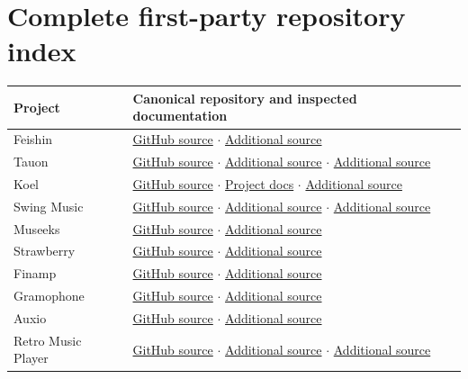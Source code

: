 \documentclass[10pt,a4paper,oneside]{report}
\begin{document}
\section*{Complete first-party repository index}
\begin{longtable}{@{}p{38mm}p{112mm}@{}}\toprule Project & Canonical repository and inspected documentation\\\midrule\endhead
Feishin & \href{https://github.com/jeffvli/feishin}{GitHub source} $\cdot$ \href{https://github.com/jeffvli/feishin/blob/development/README.md}{Additional source}\\
Tauon & \href{https://github.com/Taiko2k/Tauon}{GitHub source} $\cdot$ \href{https://github.com/Taiko2k/Tauon/blob/master/pyproject.toml}{Additional source} $\cdot$ \href{https://github.com/Taiko2k/Tauon/blob/master/CHANGELOG.md}{Additional source}\\
Koel & \href{https://github.com/koel/koel}{GitHub source} $\cdot$ \href{https://docs.koel.dev/}{Project docs} $\cdot$ \href{https://github.com/koel/koel/blob/master/README.md}{Additional source}\\
Swing Music & \href{https://github.com/swingmx/swingmusic}{GitHub source} $\cdot$ \href{https://github.com/swingmx/swingmusic/blob/master/Dockerfile}{Additional source} $\cdot$ \href{https://github.com/swingmx/webclient}{Additional source}\\
Museeks & \href{https://github.com/martpie/museeks}{GitHub source} $\cdot$ \href{https://github.com/martpie/museeks/blob/master/README.md}{Additional source}\\
Strawberry & \href{https://github.com/strawberrymusicplayer/strawberry}{GitHub source} $\cdot$ \href{https://github.com/strawberrymusicplayer/strawberry/blob/master/README.md}{Additional source}\\
Finamp & \href{https://github.com/finamp-app/finamp}{GitHub source} $\cdot$ \href{https://github.com/finamp-app/finamp/blob/redesign/README.md}{Additional source}\\
Gramophone & \href{https://github.com/FoedusProgramme/Gramophone}{GitHub source} $\cdot$ \href{https://github.com/FoedusProgramme/Gramophone/blob/beta/readme.md}{Additional source}\\
Auxio & \href{https://github.com/OxygenCobalt/Auxio}{GitHub source} $\cdot$ \href{https://github.com/OxygenCobalt/Auxio/blob/dev/README.md}{Additional source}\\
Retro Music Player & \href{https://github.com/RetroMusicPlayer/RetroMusicPlayer}{GitHub source} $\cdot$ \href{https://retromusic.app/RetroMusicPlayer}{Additional source} $\cdot$ \href{https://github.com/RetroMusicPlayer/RetroMusicPlayer/blob/dev/README.md}{Additional source}\\

\end{longtable}
\end{document}
